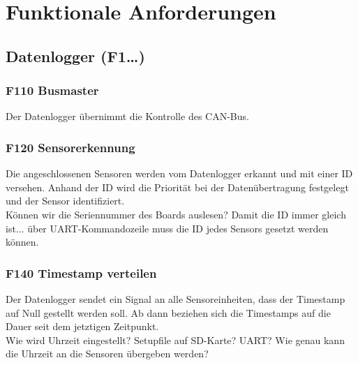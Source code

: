 %
%

\thispagestyle{empty}
\chapter{Funktionale Anforderungen}\label{chap.funktionale}
\section{Datenlogger (F1\ldots)}

\subsection{F110 Busmaster}
Der Datenlogger übernimmt die Kontrolle des CAN-Bus. 

\subsection{F120 Sensorerkennung}
Die angeschlossenen Sensoren werden vom Datenlogger erkannt und mit einer ID versehen. Anhand der ID wird die Priorität bei der Datenübertragung festgelegt und der Sensor identifiziert.\\
Können wir die Seriennummer des Boards auslesen? Damit die ID immer gleich ist... über UART-Kommandozeile muss die ID jedes Sensors gesetzt werden können.

\subsection{F140 Timestamp verteilen}
Der Datenlogger sendet ein Signal an alle Sensoreinheiten, dass der Timestamp auf Null gestellt werden soll. Ab dann beziehen sich die Timestamps auf die Dauer seit dem jetztigen Zeitpunkt.\\
Wie wird Uhrzeit eingestellt? Setupfile auf SD-Karte? UART? Wie genau kann die Uhrzeit an die Sensoren übergeben werden?

